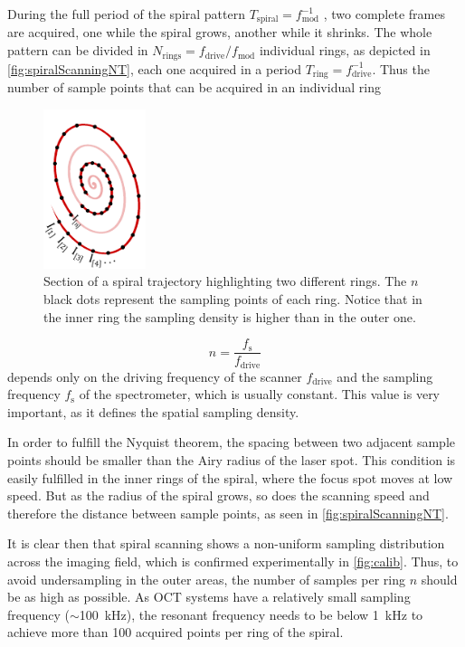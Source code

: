 \documentclass[10pt]{iopart}
\begin{document}
During the full period of the spiral pattern $T_\mathrm{spiral}=f_\mathrm{mod}^{-1}$ , two complete frames are acquired, one while the spiral grows, another while it shrinks. The whole pattern can be divided in $N_\mathrm{rings} = f_\mathrm{drive}/f_\mathrm{mod}$ individual rings, as depicted in \autoref{fig:spiralScanningNT}, each one acquired in a period $T_\mathrm{ring}=f_\mathrm{drive}^{-1}$. Thus the number of sample points that can be acquired in an individual ring
\begin{figure}[h!]\centering
      \includegraphics[width=3cm]{figures/spiralScanningNT.pdf}
      \caption{Section of a spiral trajectory highlighting two different rings. The $n$ black dots represent the sampling points of each ring. Notice that in the inner ring the sampling density is higher than in the outer one.}
      \label{fig:spiralScanningNT}
\end{figure}
\begin{equation}
n = \frac{f_\mathrm{s}}{f_\mathrm{drive}}
\label{eq:nT}
\end{equation}
depends only on the driving frequency of the scanner $f_\mathrm{drive}$ and the sampling frequency $f_\mathrm{s}$ of the spectrometer, which is usually constant. This value is very important, as it defines the spatial sampling density. 

In order to fulfill the Nyquist theorem, the spacing between two adjacent sample points should be smaller than the Airy radius of the laser spot. This condition is easily fulfilled in the inner rings of the spiral, where the focus spot moves at low speed. But as the radius of the spiral grows, so does the scanning speed and therefore the distance between sample points, as seen in \autoref{fig:spiralScanningNT}.

It is clear then that spiral scanning shows a non-uniform sampling distribution across the imaging field, which is confirmed experimentally in \autoref{fig:calib}. Thus, to avoid undersampling in the outer areas, the number of samples per ring $n$ should be as high as possible. As OCT systems have a relatively small sampling frequency ($\sim$\SI{100}{\kilo\hertz}), the resonant frequency needs to be below \SI{1}{kHz} to achieve more than 100 acquired points per ring of the spiral.
\end{document}
